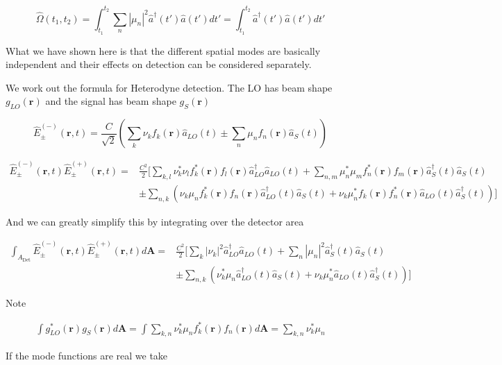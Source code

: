 \documentclass[12pt]{article}
\newcommand{\bv}[1]{\textbf{#1}}
\begin{document}
\begin{equation}
\hat{\Omega}(t_1,t_2) = \int_{t_1}^{t_2} \sum_n |\mu_n|^2 \hat{a}^{\dag}(t') \hat{a}(t') dt' = \int_{t_1}^{t_2} \hat{a}^{\dag}(t') \hat{a}(t') dt'
\end{equation}

What we have shown here is that the different spatial modes are basically independent and their effects on detection can be considered separately.

We work out the formula for Heterodyne detection. The LO has beam shape $g_{LO}(\bv{r})$ and the signal has beam shape $g_{S}(\bv{r})$ 

\begin{equation}
\hat{E}_{\pm}^{(-)}(\bv{r},t) = \frac{C}{\sqrt{2}}\left(\sum_{k}\nu_k f_k(\bv{r})\hat{a}_{LO}(t) \pm \sum_n \mu_n f_n(\bv{r}) \hat{a}_S(t)\right)
\end{equation}

\begin{align}
\hat{E}_{\pm}^{(-)}(\bv{r},t) \hat{E}_{\pm}^{(+)}(\bv{r},t) =& \frac{C^2}{2}  \bigg[\sum_{k,l}\nu_k^* \nu_l f_k^*(\bv{r})f_l(\bv{r}) \hat{a}^{\dag}_{LO} \hat{a}_{LO}(t) + \sum_{n,m} \mu_n^* \mu_m f_n^*(\bv{r}) f_m(\bv{r}) \hat{a}^{\dag}_S(t) \hat{a}_S(t)\\
&\pm \sum_{n,k} \left(\nu_k \mu_n f_k^*(\bv{r}) f_n(\bv{r}) \hat{a}^{\dag}_{LO}(t) \hat{a}_S(t) + \nu_k \mu_n^* f_k(\bv{r}) f_n^*(\bv{r}) \hat{a}_{LO}(t) \hat{a}^{\dag}_S(t) \right) \bigg]
\end{align}

And we can greatly simplify this by integrating over the detector area

\begin{align}
\int_{A_{\text{Det}}} \hat{E}_{\pm}^{(-)}(\bv{r},t) \hat{E}_{\pm}^{(+)}(\bv{r},t) d\bv{A} =& \frac{C^2}{2}  \bigg[ \sum_k |\nu_k|^2 \hat{a}^{\dag}_{LO} \hat{a}_{LO}(t) + \sum_{n} |\mu_n|^2 \hat{a}^{\dag}_S(t) \hat{a}_S(t)\\
&\pm \sum_{n,k} \left(\nu_k^* \mu_n \hat{a}^{\dag}_{LO}(t) \hat{a}_S(t) + \nu_k \mu_n^* \hat{a}_{LO}(t) \hat{a}^{\dag}_S(t) \right) \bigg]
\end{align}

Note

\begin{align}
\int g_{LO}^*(\bv{r})g_S(\bv{r}) d\bv{A} = \int \sum_{k,n} \nu_k^* \mu_n f_k^*(\bv{r}) f_n(\bv{r}) d\bv{A} = \sum_{k,n} \nu_k^* \mu_n
\end{align}

If the mode functions are real we take
\end{document}
